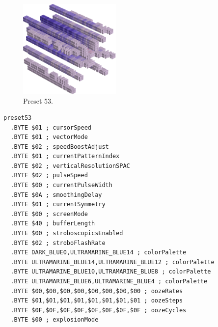 \vspace*{0.3cm}
\begin{minipage}[b]{0.48\linewidth}
\begin{figure}[H]                                                          
  \centering                                                             
  \begin{adjustbox}{width=5cm,center}                                   
  \includegraphics[width=5cm]{src/colorspace_presets/preset53-45.png}%
  \end{adjustbox}                                                        
\caption*{Preset 53.}                                           
\end{figure}                                                               
\end{minipage}
\hspace{0.1cm}
\begin{minipage}[b]{0.48\linewidth}                                                                         
\begin{lstlisting}[basicstyle=\ttfamily\tiny]
preset53
  .BYTE $01 ; cursorSpeed
  .BYTE $01 ; vectorMode
  .BYTE $02 ; speedBoostAdjust
  .BYTE $01 ; currentPatternIndex
  .BYTE $02 ; verticalResolutionSPAC
  .BYTE $02 ; pulseSpeed
  .BYTE $00 ; currentPulseWidth
  .BYTE $0A ; smoothingDelay
  .BYTE $01 ; currentSymmetry
  .BYTE $00 ; screenMode
  .BYTE $40 ; bufferLength
  .BYTE $00 ; stroboscopicsEnabled
  .BYTE $02 ; stroboFlashRate
  .BYTE DARK_BLUE0,ULTRAMARINE_BLUE14 ; colorPalette
  .BYTE ULTRAMARINE_BLUE14,ULTRAMARINE_BLUE12 ; colorPalette
  .BYTE ULTRAMARINE_BLUE10,ULTRAMARINE_BLUE8 ; colorPalette
  .BYTE ULTRAMARINE_BLUE6,ULTRAMARINE_BLUE4 ; colorPalette
  .BYTE $00,$00,$00,$00,$00,$00,$00,$00 ; oozeRates
  .BYTE $01,$01,$01,$01,$01,$01,$01,$01 ; oozeSteps
  .BYTE $0F,$0F,$0F,$0F,$0F,$0F,$0F,$0F ; oozeCycles
  .BYTE $00 ; explosionMode
\end{lstlisting}
\end{minipage}


